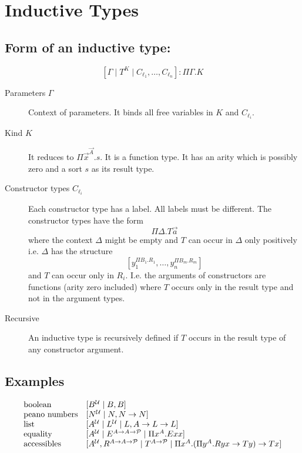 \section {Inductive Types}


\subsection{Form of an inductive type:}
$$
    [\Gamma \mid T^K \mid C_{\ell_1}, \ldots, C_{\ell_n}] : \Pi \Gamma. K
$$

\begin{description}
    \item [Parameters $\Gamma$] Context of parameters. It binds all free
        variables in $K$ and $C_{\ell_i}$.

    \item [Kind $K$] It reduces to $\Pi \vec x^{\vec A}. s$. It is a function
        type. It has an arity which is possibly zero and a sort $s$ as its
        result type.

    \item [Constructor types $C_{\ell_i}$] Each constructor type has a label.
        All labels must be different. The constructor types have the form
        $$
            \Pi \Delta. T \vec a
        $$
        where the context $\Delta$ might be empty and $T$ can occur in $\Delta$
        only positively i.e. $\Delta$ has the structure
        $$
            [y_1^{\Pi B_1. R_1}, \ldots, y_n^{\Pi B_m. R_m}]
        $$
        and $T$ can occur only in $R_i$. I.e. the arguments of constructors are
        functions (arity zero included) where $T$ occurs only in the result type
        and not in the argument types.

    \item [Recursive]
        An inductive type is recursively defined if $T$ occurs in the result
        type of any constructor argument.
\end{description}



\subsection{Examples}
$$
    \begin{array}{lll}
        \text{boolean}
        &
        [B^{\cal U} \mid B, B]
        \\
        \text{peano numbers}
        &
        [N^{\cal U} \mid N, N\to N]
        \\
        \text{list}
        &
        [A^{\cal U} \mid L^{\cal U} \mid L, A \to L\to L]
        \\
        \text{equality}
        &
        [A^{\cal U}
        \mid E^{A \to A \to {\cal P}}
        \mid \Pi x^A. E x x]
        \\
        \text{accessibles}
        &
        [
            A^{\cal U}, R^{A \to A \to {\cal P}}
            \mid
            T^{A \to {\cal P}}
            \mid
            \Pi x^A. (\Pi y^A. R y x \to T y) \to T x
        ]
    \end{array}
$$


